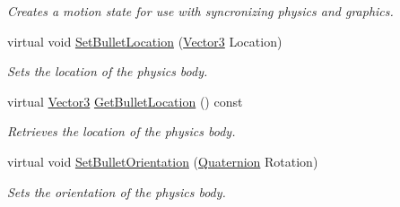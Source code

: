 \begin{DoxyCompactItemize}
\begin{DoxyCompactList}\small\item\em Creates a motion state for use with syncronizing physics and graphics. \item\end{DoxyCompactList}\item 
virtual void \hyperlink{classphys_1_1ActorBase_aa7ab524d2905e640cea6324cce9ccfdb}{SetBulletLocation} (\hyperlink{classphys_1_1Vector3}{Vector3} Location)
\begin{DoxyCompactList}\small\item\em Sets the location of the physics body. \item\end{DoxyCompactList}\item 
virtual \hyperlink{classphys_1_1Vector3}{Vector3} \hyperlink{classphys_1_1ActorBase_a9b32df1efdc346f5d6c0920b959c09a3}{GetBulletLocation} () const 
\begin{DoxyCompactList}\small\item\em Retrieves the location of the physics body. \item\end{DoxyCompactList}\item 
virtual void \hyperlink{classphys_1_1ActorBase_a492244ac46ced53b809f436da992bc84}{SetBulletOrientation} (\hyperlink{classphys_1_1Quaternion}{Quaternion} Rotation)
\begin{DoxyCompactList}\small\item\em Sets the orientation of the physics body. \item\end{DoxyCompactList}\end{DoxyCompactItemize}
